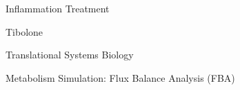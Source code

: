 \documentclass[11pt]{beamer}
\begin{document}
\begin{frame}{Inflammation Treatment}
\begin{center}

\end{center}
\end{frame}
\begin{frame}{Tibolone}
\begin{center}

\end{center}
\end{frame}
\begin{frame}{Translational Systems Biology}
\begin{center}

\end{center}
\end{frame}
\begin{frame}{Metabolism Simulation: Flux Balance Analysis (FBA)}
\begin{center}

\end{center}
\end{frame}
\end{document}
